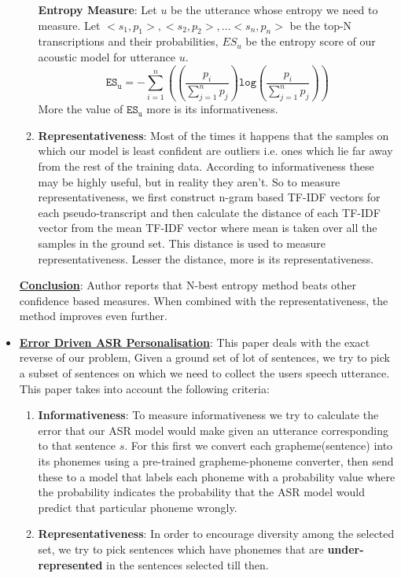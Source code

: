 \documentclass[12pt, a4paper, twoside]{article}
\begin{document}
\begin{itemize}
\begin{enumerate}
        \textbf{Entropy Measure}: Let $u$ be the utterance whose entropy we need to measure. Let  $<s_1, p_1>, <s_2, p_2>, \ldots <s_n, p_n>$ be the top-N transcriptions and their probabilities, $ES_u$ be the entropy score of our acoustic model for utterance $u$.
        $$
            \mathtt{ES_u} = - \sum_{i = 1}^{n}{\left(\left(\frac{p_i}{\sum_{j=1}^{n}{p_j}}\right)\mathtt{log}\left(\frac{p_i}{\sum_{j=1}^{n}{p_j}}\right)\right)}
        $$
        More the value of $\mathtt{ES_u}$ more is its informativeness.
        \item \textbf{Representativeness}: Most of the times it happens that the samples on which our model is least confident are outliers i.e. ones which lie far away from the rest of the training data. According to informativeness these may be highly useful, but in reality they aren't. 
        So to measure representativeness, we first construct n-gram based TF-IDF vectors for each pseudo-transcript and then calculate the distance of each TF-IDF vector from the mean TF-IDF vector where mean is taken over all the samples in the ground set. This distance is used to measure representativeness. Lesser the distance, more is its representativeness.
    \end{enumerate}

    \underline{\textbf{Conclusion}}: Author reports that N-best entropy method beats other confidence based measures. When combined with the representativeness, the method improves even further.
    
    \item \underline{\textbf{Error Driven ASR Personalisation}}\cite{awasthi2021error}: This paper deals with the exact reverse of our problem, Given a ground set of lot of sentences, we try to pick a subset of sentences on which we need to collect the users speech utterance. This paper takes into account the following criteria:
    \begin{enumerate}
        \item \textbf{Informativeness}: To measure informativeness we try to calculate the error that our ASR model would make given an utterance corresponding to that sentence $s$. For this first we convert each grapheme(sentence) into its phonemes using a pre-trained grapheme-phoneme converter, then send these to a model that labels each phoneme with a probability value where the probability indicates the probability that the ASR model would predict that particular phoneme wrongly. 
        
        \item \textbf{Representativeness}: In order to encourage diversity among the selected set, we try to pick sentences which have phonemes that are \textbf{under-represented} in the sentences selected till then.
    \end{enumerate}
\end{itemize}
\end{document}
